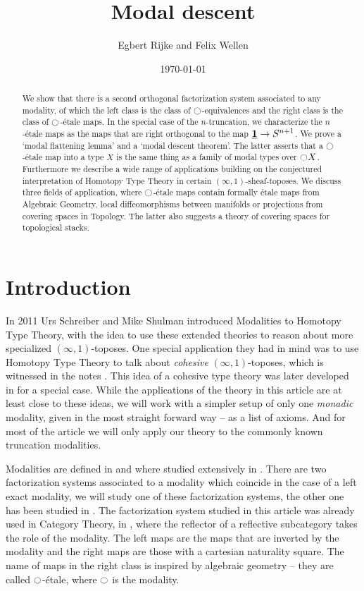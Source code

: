 \documentclass[9pt,twosided]{amsart}
\title{Modal descent}
\author{Egbert Rijke and Felix Wellen}
\date{\today}
\begin{document}
\maketitle

\begin{abstract}
  We show that there is a second orthogonal factorization system associated to any modality, of which the left class is the class of ${\ocircle}$-equivalences and the right class is the class of ${\ocircle}$-\'etale maps. In the special case of the $n$-truncation, we characterize the $n$-\'etale maps as the maps that are right orthogonal to the map $\underline{\mathbf{1}} \to S^{n+1}$. We prove a `modal flattening lemma' and a `modal descent theorem'. The latter asserts that a ${\ocircle}$-\'etale map into a type $X$ is the same thing as a family of modal types over ${\ocircle} X$. Furthermore we describe a wide range of applications building on the conjectured interpretation of Homotopy Type Theory in certain $(\infty,1)$-sheaf-toposes. We discuss three fields of application, where ${\ocircle}$-étale maps contain formally étale maps from Algebraic Geometry, local diffeomorphisms between manifolds or projections from covering spaces in Topology. The latter also suggests a theory of covering spaces for topological stacks.
\end{abstract}


\section{Introduction}
In 2011 Urs Schreiber and Mike Shulman introduced Modalities to Homotopy Type Theory,
with the idea to use these extended theories to reason about more specialized $(\infty,1)$-toposes.
One special application they had in mind was to use Homotopy Type Theory to talk about \emph{cohesive} $(\infty,1)$-toposes,
which is witnessed in the notes \cite{ShulmanSchreiber}.
This idea of a cohesive type theory was later developed in \cite{ShulmanRealCohesion} for a special case.
While the applications of the theory in this article are at least close to these ideas,
we will work with a simpler setup of only one \emph{monadic} modality, given in the most straight forward way -- as a list of axioms.
And for most of the article we will only apply our theory to the commonly known truncation modalities.
  
Modalities are defined in \cite[Section 7.7]{UFP} and where studied extensively in \cite{RijkeSpittersShulman}.
There are two factorization systems associated to a modality which coincide in the case of a left exact modality,
we will study one of these factorization systems, the other one has been studied in \cite{RijkeSpittersShulman}.
The factorization system studied in this article was already used in Category Theory, in \cite{cassidy_hebert_kelly_1986}, where the reflector of a reflective subcategory takes the role of the modality.
The left maps are the maps that are inverted by the modality and the right maps are those with a cartesian naturality square.
The name of maps in the right class is inspired by algebraic geometry -- they are called ${\ocircle}$-étale,
where ${\ocircle}$ is the modality.
\end{document}
